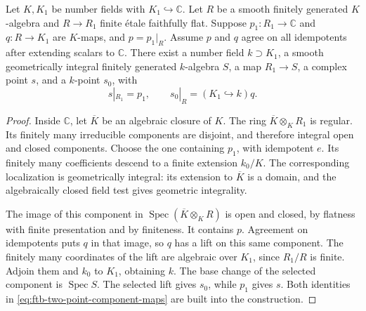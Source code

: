 \begin{srlemma}
\label{lem:ftb-two-point-etale-integral-component}
Let \(K,K_1\) be number fields with \(K_1\hookrightarrow\mathbb C\).
Let \(R\) be a smooth finitely generated \(K\)-algebra and
\(R\to R_1\) finite \'{e}tale faithfully flat.
Suppose \(p_1:R_1\to\mathbb C\) and \(q:R\to K_1\) are
\(K\)-maps, and \(p=p_1|_R\).
Assume \(p\) and \(q\) agree on all idempotents after extending
scalars to \(\mathbb C\).
There exist a number field \(k\supset K_1\), a smooth
geometrically integral finitely generated \(k\)-algebra \(S\),
a map \(R_1\to S\), a complex point \(s\), and a \(k\)-point
\(s_0\), with
\[
              s|_{R_1}=p_1,\qquad
              s_0|_R=(K_1\hookrightarrow k)q .
 \tag{F6}\label{eq:ftb-two-point-component-maps}
\]
\end{srlemma}
\begin{proof}
Inside \(\mathbb C\), let \(\overline K\) be an algebraic closure
of \(K\).  The ring \(\overline K\otimes_KR_1\) is regular.
Its finitely many irreducible components are disjoint, and
therefore integral open and closed components.
Choose the one containing \(p_1\), with idempotent \(e\).
Its finitely many coefficients descend to a finite extension
\(k_0/K\).
The corresponding localization is geometrically integral:
its extension to \(\overline K\) is a domain, and the
algebraically closed field test gives geometric integrality.

The image of this component in
\(\operatorname{Spec}(\overline K\otimes_KR)\) is open and
closed, by flatness with finite presentation and by finiteness.
It contains \(p\).  Agreement on idempotents puts \(q\) in
that image, so \(q\) has a lift on this same component.
The finitely many coordinates of the lift are algebraic over
\(K_1\), since \(R_1/R\) is finite.
Adjoin them and \(k_0\) to \(K_1\), obtaining \(k\).
The base change of the selected component is \(\operatorname{Spec}S\).
The selected lift gives \(s_0\), while \(p_1\) gives \(s\).
Both identities in \eqref{eq:ftb-two-point-component-maps}
are built into the construction.
\end{proof}

